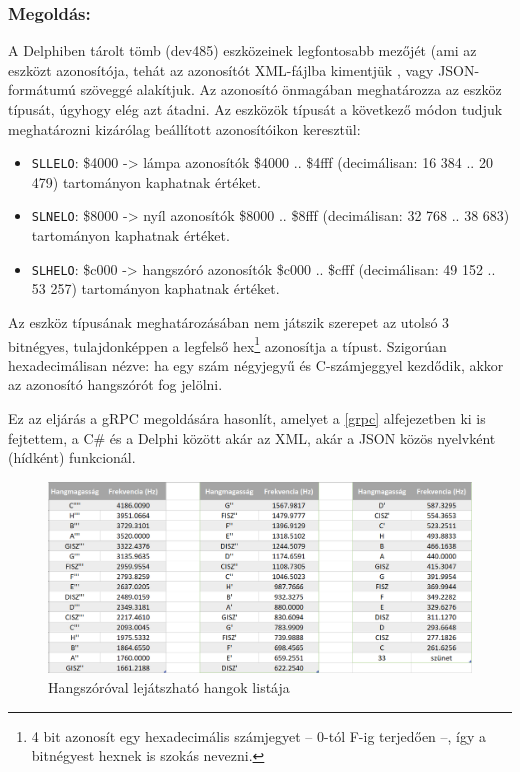 \documentclass[tocnopagenum]{thesis-ekf}
\theoremstyle{definition}
\theoremstyle{remark}
\begin{document}
	\subsubsection{Megoldás:}
	A Delphiben tárolt tömb (dev485) eszközeinek legfontosabb mezőjét (ami az eszközt azonosítója, tehát az azonosítót XML-fájlba kimentjük \cite{sof_xmlcreate}, vagy JSON-formátumú szöveggé alakítjuk. Az azonosító önmagában meghatározza az eszköz típusát, úgyhogy elég azt átadni.
	Az eszközök típusát a következő módon tudjuk meghatározni kizárólag beállított azonosítóikon keresztül:
	\begin{itemize}
		\item \verb*|SLLELO|: \$4000 -> lámpa azonosítók \$4000 .. \$4fff (decimálisan: 16 384 .. 20 479) tartományon kaphatnak értéket.
		\item \verb*|SLNELO|: \$8000 -> nyíl azonosítók \$8000 .. \$8fff (decimálisan: 32 768 .. 38 683) tartományon kaphatnak értéket.
		\item \verb*|SLHELO|: \$c000 -> hangszóró azonosítók \$c000 .. \$cfff (decimálisan: 49 152 .. 53 257) tartományon kaphatnak értéket.
	\end{itemize}
	
	Az eszköz típusának meghatározásában nem játszik szerepet az utolsó 3 bitnégyes, tulajdonképpen a legfelső hex\footnote{4 bit azonosít egy hexadecimális számjegyet -- 0-tól F-ig terjedően --, így a bitnégyest hexnek is szokás nevezni.} azonosítja a típust.
	Szigorúan hexadecimálisan nézve: ha egy szám négyjegyű és C-számjeggyel kezdődik, akkor az azonosító hangszórót fog jelölni.
	
	Ez az eljárás a gRPC megoldására hasonlít, amelyet a  \ref{grpc} alfejezetben ki is fejtettem, a C\# és a Delphi között akár az XML, akár a JSON közös nyelvként (hídként) funkcionál.
	\begin{figure}[h!]
		\centering
		\includegraphics[scale=0.7]{frequencies}
		\caption{Hangszóróval lejátszható hangok listája}
		\label{fig:frequencies}
	\end{figure}
\end{document}
